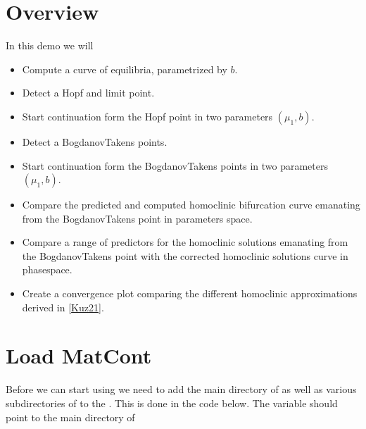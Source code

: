 \documentclass[letterpaper,10pt,english]{jupyterBook}
\begin{document}
\section{Overview}
\label{\detokenize{SIRmodel:overview}}
\sphinxAtStartPar
In this demo we will
\begin{itemize}
\item {} 
\sphinxAtStartPar
Compute a curve of equilibria, parametrized by \(b\).

\item {} 
\sphinxAtStartPar
Detect a Hopf and limit point.

\item {} 
\sphinxAtStartPar
Start continuation form the Hopf point in two parameters \((\mu_1, b)\).

\item {} 
\sphinxAtStartPar
Detect a Bogdanov\sphinxhyphen{}Takens points.

\item {} 
\sphinxAtStartPar
Start continuation form the Bogdanov\sphinxhyphen{}Takens points in two parameters \((\mu_1, b)\).

\item {} 
\sphinxAtStartPar
Compare the predicted and computed homoclinic bifurcation curve emanating
from the Bogdanov\sphinxhyphen{}Takens point in parameters space.

\item {} 
\sphinxAtStartPar
Compare a range of predictors for the homoclinic solutions emanating from the
Bogdanov\sphinxhyphen{}Takens point with the corrected homoclinic solutions curve in
phase\sphinxhyphen{}space.

\item {} 
\sphinxAtStartPar
Create a convergence plot comparing the different homoclinic approximations
derived in {[}\hyperlink{cite.references:id3}{Kuz21}{]}.

\end{itemize}


\section{Load MatCont}
\label{\detokenize{SIRmodel:load-matcont}}
\sphinxAtStartPar
Before we can start using  we need to add the main directory of
 as well as various subdirectories of  to the . This is done in the code below. The variable 
should point to the main directory of 
\end{document}
